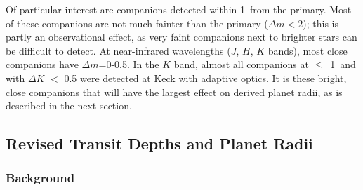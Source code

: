 \documentclass[twocolumn,appendixfloats]{aastex6}
\begin{document}
Of particular interest are companions detected within 1\arcsec\ from 
the primary. Most of these companions are not much fainter than the 
primary ($\Delta m < 2$); this is partly an observational effect, as very 
faint companions next to brighter stars can be difficult to detect. 
At near-infrared wavelengths ($J$, $H$, $K$ bands), most close 
companions have $\Delta m$=0-0.5. In the $K$ band, almost all 
companions at $\leq$~1\arcsec\ and with $\Delta K$ $<$ 0.5 were
detected at Keck with adaptive optics.
It is these bright, close companions that will have the largest effect
on derived planet radii, as is described in the next section.


\subsection{Revised Transit Depths and Planet Radii}
\label{revised_radii}

\subsubsection{Background}
\end{document}
